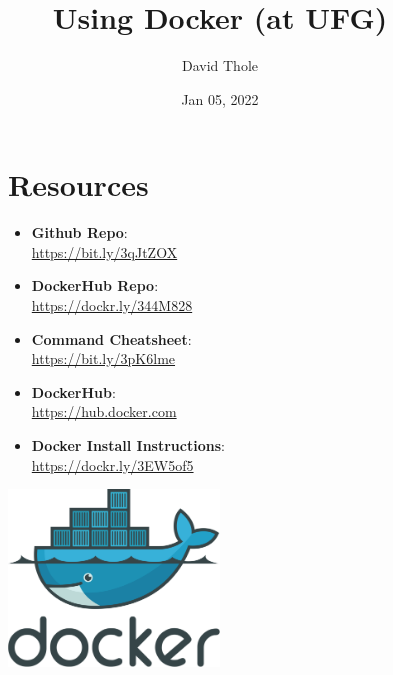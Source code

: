 \documentclass[legal,12pt,oneside,pdflatex,final,twocolumn]{article}
\title{Using Docker (at UFG)}
\author{David Thole}
\date{Jan 05, 2022}
\begin{document}
\pagestyle{fancy}


\onecolumn

\begin{figure}
\begin{minipage}{0.47\textwidth}
\section{Resources}
    \begin{itemize}
        \item \textbf{Github Repo}: \\ \url{https://bit.ly/3qJtZOX}
        \item \textbf{DockerHub Repo}: \\ \url{https://dockr.ly/344M828}
        \item \textbf{Command Cheatsheet}: \\ \url{https://bit.ly/3pK6lme}
        \item \textbf{DockerHub}: \\ \url{https://hub.docker.com}
        \item \textbf{Docker Install Instructions}: \\ \url{https://dockr.ly/3EW5of5}
    \end{itemize}
\end{minipage}
\hfill
\begin{minipage}{0.47\textwidth}
  \centering
  \includegraphics[width=0.5\textwidth,right]{XX-DockerLogo.png}
\end{minipage}
\end{figure}
\end{document}
